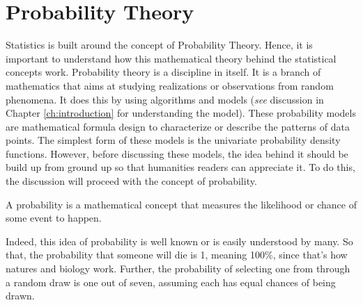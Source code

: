 \section{Probability Theory}\label{sec:probability_method}
Statistics is built around the concept of Probability Theory. Hence, it is important to understand how this mathematical theory behind the statistical concepts work. Probability theory is a discipline in itself. It is a branch of mathematics that aims at studying realizations or observations from random phenomena. It does this by using algorithms and models (\textit{see} discussion in Chapter \ref{ch:introduction} for understanding the model). These probability models are mathematical formula design to characterize or describe the patterns of data points. The simplest form of these models is the univariate probability density functions. However, before discussing these models, the idea behind it should be build up from ground up so that humanities readers can appreciate it. To do this, the discussion will proceed with the concept of probability.
\begin{defn}[Probability]\label{defn:probability}
A probability is a mathematical concept that measures the likelihood or chance of some event to happen.
\end{defn}
Indeed, this idea of probability is well known or is easily understood by many. So that, the probability that someone will die is 1, meaning 100\%, since that's how natures and biology work. Further, the probability of selecting one   from   through a random draw is one out of seven, assuming each   has equal chances of being drawn.

